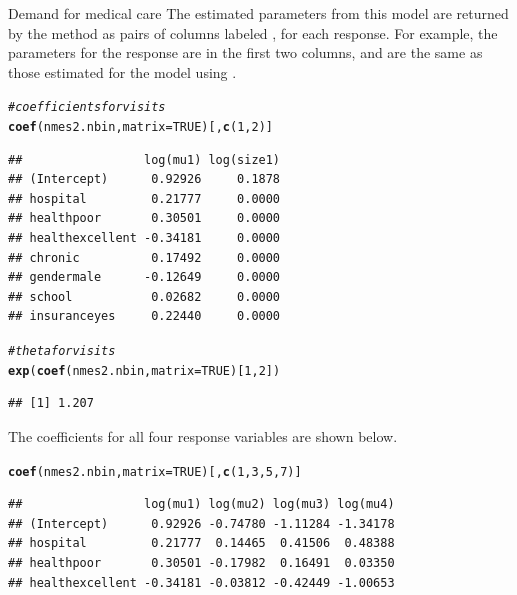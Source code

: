 \documentclass[11pt]{book}\usepackage[]{graphicx}\usepackage[]{color}
\makeatletter
\newcommand{\hlnum}[1]{\textcolor[rgb]{0.686,0.059,0.569}{#1}}%
\newcommand{\hlcom}[1]{\textcolor[rgb]{0.678,0.584,0.686}{\textit{#1}}}%
\newcommand{\hlstd}[1]{\textcolor[rgb]{0.345,0.345,0.345}{#1}}%
\newcommand{\hlkwc}[1]{\textcolor[rgb]{0.333,0.667,0.333}{#1}}%
\newcommand{\hlkwd}[1]{\textcolor[rgb]{0.737,0.353,0.396}{\textbf{#1}}}%
\newenvironment{kframe}{%
 \def\at@end@of@kframe{}%
 \ifinner\ifhmode%
  \def\at@end@of@kframe{\end{minipage}}%
  \begin{minipage}{\columnwidth}%
 \fi\fi%
 \def\FrameCommand##1{\hskip\@totalleftmargin \hskip-\fboxsep
 \colorbox{shadecolor}{##1}\hskip-\fboxsep
     \hskip-\linewidth \hskip-\@totalleftmargin \hskip\columnwidth}%
 \MakeFramed {\advance\hsize-\width
   \@totalleftmargin\z@ \linewidth\hsize
   \@setminipage}}%
 {\par\unskip\endMakeFramed%
 \at@end@of@kframe}
\newenvironment{knitrout}{}{} %
\renewenvironment{knitrout}{\small\renewcommand{\baselinestretch}{.85}}{} %
\makeatother
\begin{document}
\begin{Example}[nmes5]{Demand for medical care}
The estimated parameters from this model are returned by the  method as pairs of
columns labeled ,  for each response.  
For example, the parameters for the  response are in the first two columns,
and are the same as those estimated for the model  using .
\begin{knitrout}
\color{fgcolor}\begin{kframe}
\begin{alltt}
\hlcom{# coefficients for visits}
\hlkwd{coef}\hlstd{(nmes2.nbin,} \hlkwc{matrix}\hlstd{=}\hlnum{TRUE}\hlstd{)[,}\hlkwd{c}\hlstd{(}\hlnum{1}\hlstd{,}\hlnum{2}\hlstd{)]}
\end{alltt}
\begin{verbatim}
##                 log(mu1) log(size1)
## (Intercept)      0.92926     0.1878
## hospital         0.21777     0.0000
## healthpoor       0.30501     0.0000
## healthexcellent -0.34181     0.0000
## chronic          0.17492     0.0000
## gendermale      -0.12649     0.0000
## school           0.02682     0.0000
## insuranceyes     0.22440     0.0000
\end{verbatim}
\begin{alltt}
\hlcom{# theta for visits}
\hlkwd{exp}\hlstd{(}\hlkwd{coef}\hlstd{(nmes2.nbin,} \hlkwc{matrix}\hlstd{=}\hlnum{TRUE}\hlstd{)[}\hlnum{1}\hlstd{,}\hlnum{2}\hlstd{])}
\end{alltt}
\begin{verbatim}
## [1] 1.207
\end{verbatim}
\end{kframe}
\end{knitrout}
The  coefficients for all four response variables are shown below.  
\begin{knitrout}
\color{fgcolor}\begin{kframe}
\begin{alltt}
\hlkwd{coef}\hlstd{(nmes2.nbin,} \hlkwc{matrix}\hlstd{=}\hlnum{TRUE}\hlstd{)[,}\hlkwd{c}\hlstd{(}\hlnum{1}\hlstd{,}\hlnum{3}\hlstd{,}\hlnum{5}\hlstd{,}\hlnum{7}\hlstd{)]}
\end{alltt}
\begin{verbatim}
##                 log(mu1) log(mu2) log(mu3) log(mu4)
## (Intercept)      0.92926 -0.74780 -1.11284 -1.34178
## hospital         0.21777  0.14465  0.41506  0.48388
## healthpoor       0.30501 -0.17982  0.16491  0.03350
## healthexcellent -0.34181 -0.03812 -0.42449 -1.00653

\end{verbatim}
\end{kframe}
\end{knitrout}
\end{Example}
\end{document}
